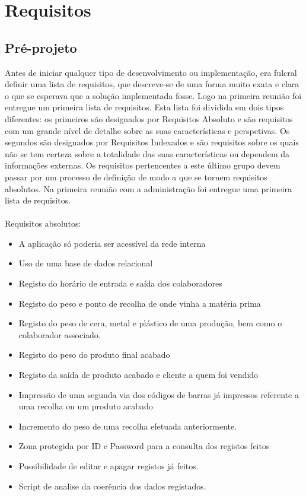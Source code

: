 \chapter{Requisitos} 
\label{cap:3}

\section{Pré-projeto}
Antes de iniciar qualquer tipo de desenvolvimento ou implementação, era fulcral definir uma lista de requisitos, que descreve-se de uma forma muito exata e clara o que se esperava que a solução implementada fosse. Logo na primeira reunião foi entregue um primeira lista de requisitos. Esta lista foi dividida em dois tipos diferentes: os primeiros são designados por Requisitos Absoluto e são requisitos com um grande nível de detalhe sobre as suas características e perspetivas. Os segundos são designados por Requisitos Indexados e são requisitos sobre os quais não se tem certeza sobre a totalidade das suas características ou dependem da informações externas. Os requisitos pertencentes a este último grupo devem passar por um processo de definição de modo a que se tornem requisitos absolutos.
Na primeira reunião com a administração foi entregue uma primeira lista de requisitos.\\
\\
Requisitos absolutos:
\begin{itemize}
	\item A aplicação só poderia ser acessível da rede interna
	\item Uso de uma base de dados relacional
	\item Registo do horário de entrada e saída dos colaboradores
	\item Registo do peso e ponto de recolha de onde vinha a matéria prima
	\item Registo do peso de cera, metal e plástico de uma produção, bem como o colaborador associado.
	\item Registo do peso do produto final acabado
	\item Registo da saída de produto acabado e cliente a quem foi vendido
	\item Impressão de uma segunda via dos códigos de barras já impressos referente a uma recolha ou um produto acabado
	\item Incremento do peso de uma recolha efetuada anteriormente.
	\item Zona protegida por ID e Password para a consulta dos registos feitos
	\item Possibilidade de editar e apagar registos já feitos.
	\item Script de analise da coerência dos dados registados.
\end{itemize}
